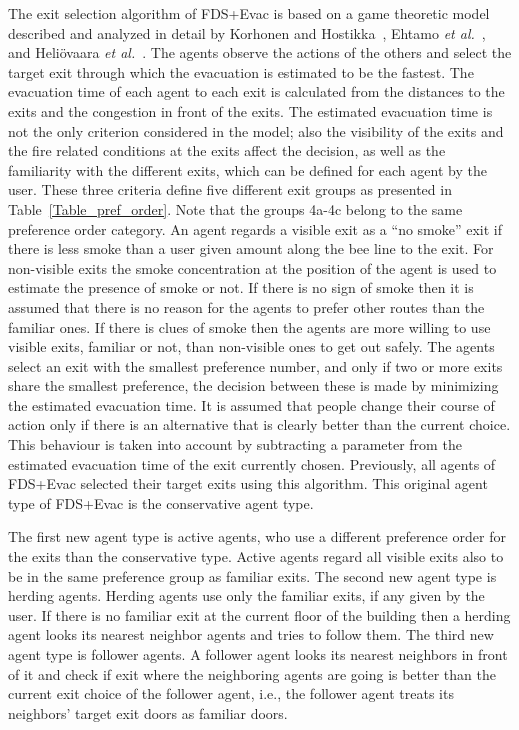 \documentclass[12pt,a4paper,final,twoside]{stylevk}
\begin{document}
The exit selection algorithm of FDS+Evac is based on a game theoretic
model described and analyzed in detail by Korhonen and
Hostikka~\cite{Korhonen09}, Ehtamo \emph{et al.}~\cite{Ehtamo2010},
and Heliövaara \emph{et al.}~\cite{Heliovaara10}.  The agents observe
the actions of the others and select the target exit through which the
evacuation is estimated to be the fastest.  The evacuation time of
each agent to each exit is calculated from the distances to the exits
and the congestion in front of the exits.  The estimated evacuation
time is not the only criterion considered in the model; also the
visibility of the exits and the fire related conditions at the exits
affect the decision, as well as the familiarity with the different
exits, which can be defined for each agent by the user.  These three
criteria define five different exit groups as presented in
Table~\ref{Table_pref_order}.  Note that the groups 4a-4c belong to
the same preference order category.  An agent regards a visible exit
as a ``no smoke'' exit if there is less smoke than a user given amount
along the bee line to the exit.  For non-visible exits the smoke
concentration at the position of the agent is used to estimate the
presence of smoke or not.  If there is no sign of smoke then it is
assumed that there is no reason for the agents to prefer other routes
than the familiar ones.  If there is clues of smoke then the agents
are more willing to use visible exits, familiar or not, than
non-visible ones to get out safely.  The agents select an exit with
the smallest preference number, and only if two or more exits share
the smallest preference, the decision between these is made by
minimizing the estimated evacuation time.  It is assumed that people
change their course of action only if there is an alternative that is
clearly better than the current choice.  This behaviour is taken into
account by subtracting a parameter from the estimated evacuation time
of the exit currently chosen.  Previously, all agents of FDS+Evac
selected their target exits using this algorithm.  This original agent
type of FDS+Evac is the conservative agent type.


The first new agent type is active agents, who use a different
preference order for the exits than the conservative type.  Active
agents regard all visible exits also to be in the same preference
group as familiar exits.  The second new agent type is herding agents.
Herding agents use only the familiar exits, if any given by the user.
If there is no familiar exit at the current floor of the building then
a herding agent looks its nearest neighbor agents and tries to follow
them. The third new agent type is follower agents.  A follower agent
looks its nearest neighbors in front of it and check if exit where the
neighboring agents are going is better than the current exit choice of
the follower agent, i.e., the follower agent treats its neighbors'
target exit doors as familiar doors.
\end{document}
